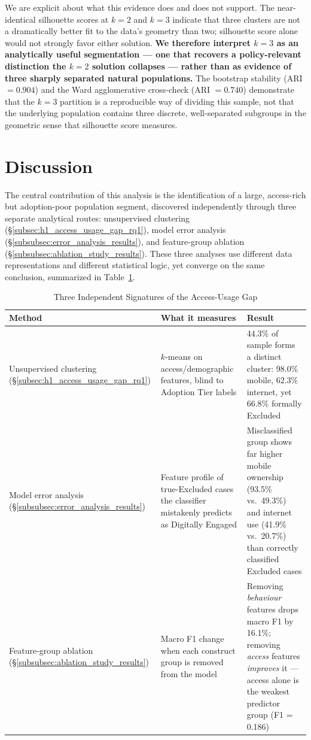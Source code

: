 \documentclass[conference]{IEEEtran}
\begin{document}
We are explicit about what this evidence does and does not support. The
near-identical silhouette scores at $k=2$ and $k=3$ indicate that three
clusters are not a dramatically better fit to the data's geometry than
two; silhouette score alone would not strongly favor either solution.
\textbf{We therefore interpret $k=3$ as an analytically useful
segmentation --- one that recovers a policy-relevant distinction the
$k=2$ solution collapses --- rather than as evidence of three sharply
separated natural populations.} The bootstrap stability (ARI $= 0.904$)
and the Ward agglomerative cross-check (ARI $= 0.740$) demonstrate that
the $k=3$ partition is a reproducible way of dividing this sample, not
that the underlying population contains three discrete, well-separated
subgroups in the geometric sense that silhouette score measures.
 
\section{Discussion}
\label{sec:discussion}

The central contribution of this analysis is the identification of a
large, access-rich but adoption-poor population segment, discovered
independently through three separate analytical routes: unsupervised
clustering (\S\ref{subsec:h1_access_usage_gap_rq1}), model error analysis (\S\ref{subsubsec:error_analysis_results}), and feature-group
ablation (\S\ref{subsubsec:ablation_study_results}). These three analyses use different data
representations and different statistical logic, yet converge on the same
conclusion, summarized in Table~\ref{tab:convergence}.

\begin{table}[h]
\caption{Three Independent Signatures of the Access-Usage Gap}
\label{tab:convergence}
\centering
\renewcommand{\arraystretch}{1.3}
\begin{tabular}{p{1.7cm}p{2.9cm}p{2.9cm}}
\toprule
\textbf{Method} & \textbf{What it measures} & \textbf{Result} \\
\midrule
Unsupervised clustering (\S\ref{subsec:h1_access_usage_gap_rq1}) &
$k$-means on access/demographic features, blind to Adoption Tier labels &
44.3\% of sample forms a distinct cluster: 98.0\% mobile, 62.3\% internet,
yet 66.8\% formally Excluded \\
\addlinespace
Model error analysis (\S\ref{subsubsec:error_analysis_results}) &
Feature profile of true-Excluded cases the classifier mistakenly predicts
as Digitally Engaged &
Misclassified group shows far higher mobile ownership (93.5\% vs.\ 49.3\%)
and internet use (41.9\% vs.\ 20.7\%) than correctly classified Excluded
cases \\
\addlinespace
Feature-group ablation (\S\ref{subsubsec:ablation_study_results}) &
Macro F1 change when each construct group is removed from the model &
Removing \emph{behaviour} features drops macro F1 by 16.1\%; removing
\emph{access} features \emph{improves} it --- access alone is the weakest
predictor group (F1 = 0.186) \\
\bottomrule
\end{tabular}
\end{table}
\end{document}
